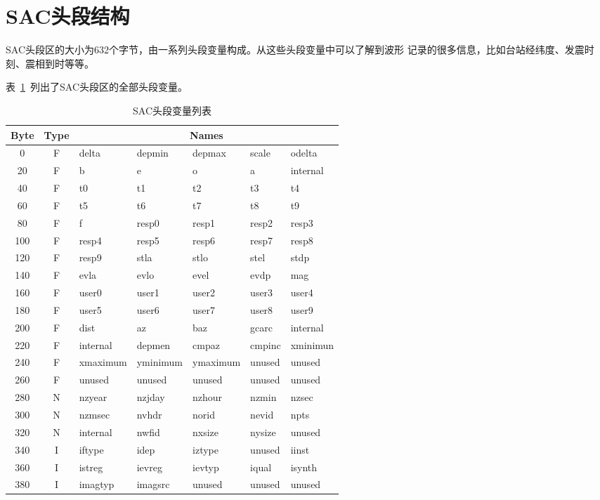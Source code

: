 \section{SAC头段结构}
SAC头段区的大小为632个字节，由一系列头段变量构成。从这些头段变量中可以了解到波形
记录的很多信息，比如台站经纬度、发震时刻、震相到时等等。

表~\ref{table:header-variables}~列出了SAC头段区的全部头段变量。

\begin{table}[H]
\ttfamily
\small
\centering
\caption{SAC头段变量列表}
\label{table:header-variables}
\begin{tabular}{c|c|lllll}
	\toprule
    Byte	&	Type	&	\multicolumn{5}{c}{Names}\\
	\midrule
	0		&	F	&	delta	&	depmin	&	depmax	&	scale	&	odelta	\\
	20		&	F	&	b		&	e		&	o		&	a		&	internal\\
	40		&	F	&	t0		&	t1		&	t2		&	t3		&	t4		\\
	60		&	F	&	t5		&	t6		&	t7		&	t8		&	t9		\\
	80		&	F	&	f		&	resp0	&	resp1	&	resp2	&	resp3	\\
	100		&	F	&	resp4	&	resp5	&	resp6	&	resp7	&	resp8	\\
    120		&	F	&	resp9	&	stla	&	stlo	&	stel	&	stdp	\\
	140		&	F	&	evla	&	evlo	&	evel	&	evdp	&	mag		\\
	160		&	F	&	user0	&	user1	&	user2	&	user3	&	user4	\\
	180		&	F	&	user5	&	user6	&	user7	&	user8	&	user9	\\
	200		&	F	&	dist	&	az		&	baz		&	gcarc	&	internal\\
	220		&	F	&	internal&	depmen	&	cmpaz	&	cmpinc	&	xminimun\\
	240		&	F	&	xmaximum&	yminimum&	ymaximum&	unused	&	unused	\\
	260		&	F	&	unused	&	unused	&	unused	&	unused	&	unused	\\
	280		&	N	&	nzyear	&	nzjday	&	nzhour	&	nzmin	&	nzsec	\\
	300		&	N	&	nzmsec	&	nvhdr	&	norid	&	nevid	&	npts	\\
	320		&	N	&	internal&	nwfid	&	nxsize	&	nysize	&	unused	\\
	340		&	I	&	iftype	&	idep	&	iztype	&	unused	&	iinst	\\
	360		&	I	&	istreg	&	ievreg	&	ievtyp	&	iqual	&	isynth	\\
    380		&	I	&	imagtyp &	imagsrc	&	unused	&	unused	&	unused	\\

\end{tabular}
\end{table}
